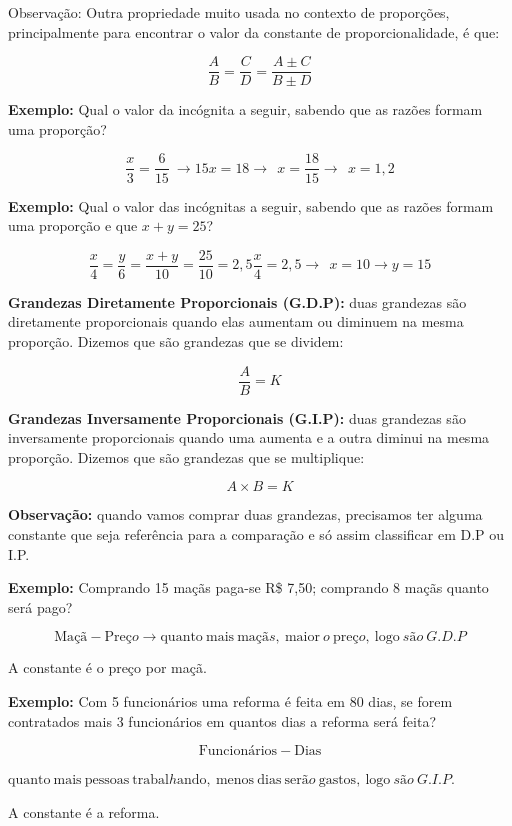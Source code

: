 {Observação}: Outra propriedade muito usada no contexto de proporções,
principalmente para encontrar o valor da constante de proporcionalidade,
é que:

\[\frac{A}{B} = \frac{C}{D} = \frac{A \pm C}{B \pm D}\]

\textbf{Exemplo:} Qual o valor da incógnita a seguir, sabendo que as
razões formam uma proporção?

\[\frac{x}{3} = \frac{6}{15}\  \rightarrow 15x = 18 \rightarrow \ \ x = \frac{18}{15} \rightarrow \ \ x = 1,2\]

\textbf{Exemplo:} Qual o valor das incógnitas a seguir, sabendo que as
razões formam uma proporção e que \(x + y = 25\)?

\[\frac{x}{4} = \frac{y}{6} = \frac{x + y}{10} = \frac{25}{10} = 2,5\frac{x}{4} = 2,5 \rightarrow \ \ x = 10 \rightarrow y = 15\]

\textbf{{Grandezas Diretamente Proporcionais (G.D.P)}:} duas grandezas
são diretamente proporcionais quando elas aumentam ou diminuem na mesma
proporção. Dizemos que são grandezas que se dividem:

\[\frac{A}{B} = K\]

\textbf{{Grandezas Inversamente Proporcionais (G.I.P)}:} duas grandezas
são inversamente proporcionais quando uma aumenta e a outra diminui na
mesma proporção. Dizemos que são grandezas que se multiplique:

\[A \times B = K\]

\textbf{Observação:} quando vamos comprar duas grandezas, precisamos ter
alguma constante que seja referência para a comparação e só assim
classificar em D.P ou I.P.

\textbf{Exemplo:} Comprando 15 maçãs paga-se R\$ 7,50; comprando 8 maçãs
quanto será pago?

\[\text{Ma}çã - \text{Pre}ço \rightarrow \text{quanto}\ \text{mais}\ \text{ma}çãs,\ \text{maior}\ o\ \text{pre}ço,\ \text{logo}\ são\ G.D.P\]

A constante é o preço por maçã.

\textbf{Exemplo:} Com 5 funcionários uma reforma é feita em 80 dias, se
forem contratados mais 3 funcionários em quantos dias a reforma será
feita?

\[\text{Funcion}á\text{rios} - \text{Dias}\]

\(\text{quanto}\ \text{mais}\ \text{pessoas}\ \text{trabal}h\text{ando},\ \text{menos}\ \text{dias}\ \text{ser}ão\ \text{gastos},\ \text{logo}\ são\ G.I.P\).

A constante é a reforma.

